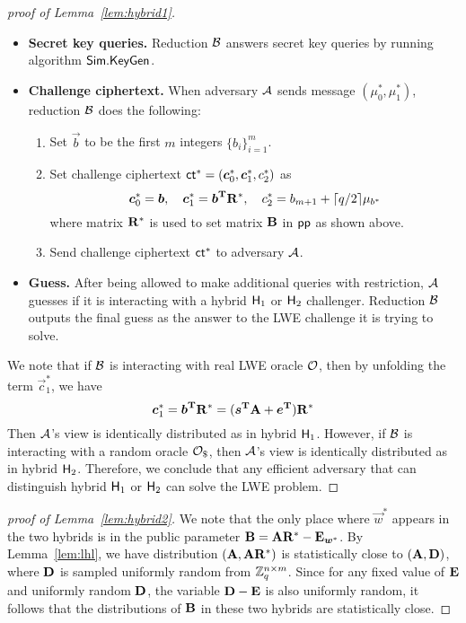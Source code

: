 \begin{proof}[proof of Lemma~\ref{lem:hybrid1}]
\begin{itemize}[leftmargin=*]
 \item\textbf{Secret key queries.} Reduction $\mathcal{B}$ answers secret key queries by running algorithm $\mathsf{Sim}.\mathsf{KeyGen}$.
 \item\textbf{Challenge ciphertext.} When adversary $\mathcal{A}$ sends message $(\mu_0^*, \mu_1^*)$, reduction $\mathcal{B}$ does the following:
 \begin{enumerate}[leftmargin=*]
  \item Set $\vec{b}$ to be the first $m$ integers $\{b_i\}_{i = 1}^m$.
  \item Set challenge ciphertext $\mathsf{ct}^* = (\boldsymbol{c}_0^*, \boldsymbol{c}_1^*, c_2^*)$ as
  $$\boldsymbol{c}^*_0 = \boldsymbol{b}, \quad \boldsymbol{c}^*_1 = \boldsymbol{b}^{\mathbf{T}} \mathbf{R}^*, \quad c^*_2 = b_{m + 1} + \lceil q / 2\rceil\mu_{b^*}$$
  where matrix $\mathbf{R}^*$ is used to set matrix $\mathbf{B}$ in $\mathsf{pp}$ as shown above.
  \item Send challenge ciphertext $\mathsf{ct}^*$ to adversary $\mathcal{A}$.
 \end{enumerate}
 \item\textbf{Guess.} After being allowed to make additional queries with restriction, $\mathcal{A}$ guesses if it is interacting with a hybrid $\mathsf{H}_1$ or $\mathsf{H}_2$ challenger. Reduction $\mathcal{B}$ outputs the final guess as the answer to the LWE challenge it is trying to solve.
\end{itemize}
We note that if $\mathcal{B}$ is interacting with real LWE oracle $\mathcal{O}$, then by unfolding the term $\vec{c}_1^*$, we have
$$\boldsymbol{c}_1^* = \boldsymbol{b}^{\mathbf{T}} \mathbf{R}^* = (\boldsymbol{s}^{\mathbf{T}} \mathbf{A} + \boldsymbol{e}^{\mathbf{T}}) \mathbf{R}^*$$
Then $\mathcal{A}$'s view is identically distributed as in hybrid $\mathsf{H}_1$. However, if $\mathcal{B}$ is interacting with a random oracle $\mathcal{O}_{\$}$, then $\mathcal{A}$'s view is identically distributed as in hybrid $\mathsf{H}_2$. Therefore, we conclude that any efficient adversary that can distinguish hybrid $\mathsf{H}_1$ or $\mathsf{H}_2$ can solve the LWE problem.
\end{proof}

\begin{proof}[proof of Lemma~\ref{lem:hybrid2}]
We note that the only place where $\vec{w}^*$ appears in the two hybrids is in the public parameter $\mathbf{B} = \mathbf{A} \mathbf{R}^* - \mathbf{E}_{\boldsymbol{w}^*}$. By Lemma~\ref{lem:lhl}, we have distribution $(\mathbf{A}, \mathbf{A}\mathbf{R}^*)$ is statistically close to $(\mathbf{A}, \mathbf{D})$, where $\mathbf{D}$ is sampled uniformly random from $\mathbb{Z}_q^{n \times m}$. Since for any fixed value of $\mathbf{E}$ and uniformly random $\mathbf{D}$, the variable $\mathbf{D} - \mathbf{E}$ is also uniformly random, it follows that the distributions of $\mathbf{B}$ in these two hybrids are statistically close.
\end{proof}